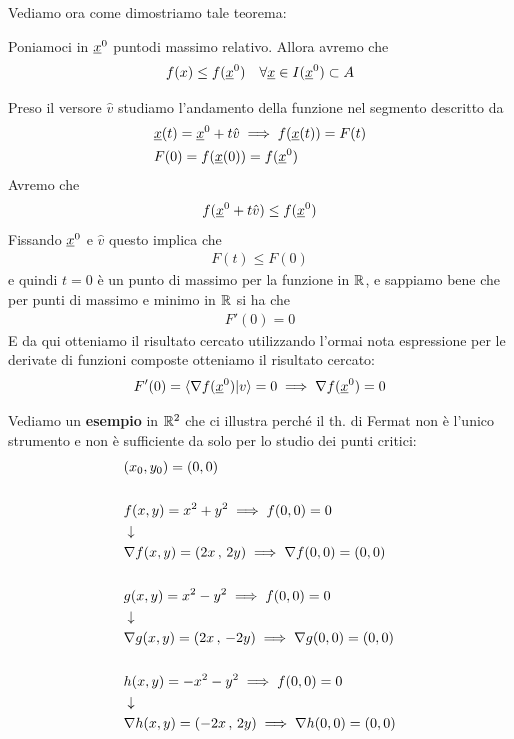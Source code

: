 Vediamo ora come dimostriamo tale teorema:

\bigskip

Poniamoci in $\underline{x}^0$ puntodi massimo relativo. Allora avremo che
\begin{align}
	f(x)\leq f(\underline{x}^0) \quad \forall \underline{x} \in I(\underline{x}^0)\subset A
\end{align}

Preso il versore $\hat{v}$ studiamo l'andamento della funzione nel segmento descritto da
\begin{align}
	{}&\underline{x}(t)=\underline{x}^0 + t\hat{v} \implies f(\underline{x}(t))=F(t)\\
	&F(0)=f(\underline{x}(0))=f(\underline{x}^0)
\end{align}
Avremo che
\begin{align}
	f(\underline{x}^0 + t\hat{v}) \leq f(\underline{x}^0)
\end{align}
Fissando $\underline{x}^0$ e $\hat{v}$ questo implica che
\begin{align}
	F(t)\leq F(0)
\end{align}
e quindi $t=0$ è un punto di massimo per la funzione in $\mathbb{R}$, e sappiamo bene che per punti di massimo e minimo in $\mathbb{R}$ si ha che
\begin{align}
	F'(0)=0
\end{align}
E da qui otteniamo il risultato cercato utilizzando l'ormai nota espressione per le derivate di funzioni composte otteniamo il risultato cercato:
\begin{align}
	F'(0)=\braket{\nabla f(\underline{x}^0)|v}=0 \implies \nabla f(\underline{x}^0)=0 
\end{align}

\newpage

Vediamo un \textbf{esempio} in $\mathbb{R}^2$ che ci illustra perché il th. di Fermat non è l'unico strumento e non è sufficiente da solo per lo studio dei punti critici:
\begin{align}
	{}&(x_0,y_0)=(0,0)\\
	\nonumber \\
	&f(x,y)=x^2 + y^2 \implies f(0,0)=0  \nonumber \\ &\downarrow \nonumber \\ 
	&\nabla f(x,y)=(2x \, , \, 2y) \implies \nabla f(0,0)= (0,0)\\
	\nonumber \\
	&g(x,y)=x^2 - y^2  \implies f(0,0)=0 \nonumber \\ &\downarrow \nonumber \\ 
	&\nabla g(x,y)=(2x \, , \, -2y) \implies \nabla g(0,0)= (0,0)\\
	\nonumber \\
	&h(x,y)= - x^2 - y^2 \implies f(0,0)=0  \nonumber \\ &\downarrow \nonumber \\ 
	&\nabla h(x,y)=(-2x \, , \, 2y) \implies \nabla h(0,0)= (0,0)
\end{align}

